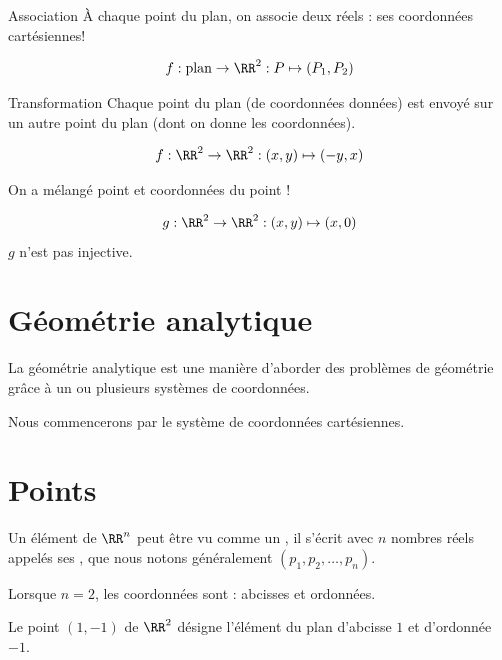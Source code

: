 \begin{frame}
  \begin{block}{Association}
  À chaque point du plan, on associe deux réels : ses coordonnées cartésiennes!

  \begin{equation*}
    f : \text{plan} \to \RR^2 : P \mapsto (P_{1},P_{2})
  \end{equation*}
\end{block}
\begin{block}{Transformation}
 Chaque point du plan (de coordonnées données) est envoyé sur un autre point du plan (dont on donne les coordonnées).

  \begin{equation*}
    f : \RR^{2} \to \RR^2 : (x,y) \mapsto (-y,x)
  \end{equation*}
  \pause

  On a mélangé \og point\fg{} et \og coordonnées du point\fg{} !\pause

  \begin{equation*}
    g : \RR^{2} \to \RR^2 : (x,y) \mapsto (x,0)
  \end{equation*}
  \pause \(g\) n'est pas injective.
\end{block}
\end{frame}

\section{Géométrie analytique}
\begin{frame}
  \begin{definition}
    La géométrie analytique est une manière d'aborder des problèmes de géométrie grâce à un ou plusieurs systèmes de coordonnées.
  \end{definition}

  Nous commencerons par le système de coordonnées cartésiennes.
\end{frame}

\section{Points}
\label{sec:vect-vers-points}
\begin{frame}
\begin{definition}
Un élément de \(\RR^{n}\) peut être vu comme un , il s'écrit avec \(n\) nombres réels appelés ses , que nous notons généralement \((p_{1}, p_{2}, \ldots, p_{n})\).

Lorsque \(n = 2\), les coordonnées sont : abcisses et ordonnées.
\end{definition}

\begin{example}
   Le point \((1,-1)\) de \(\RR^{2}\) désigne l'élément du plan d'abcisse \(1\) et d'ordonnée \(-1\).
\end{example}
\end{frame}

